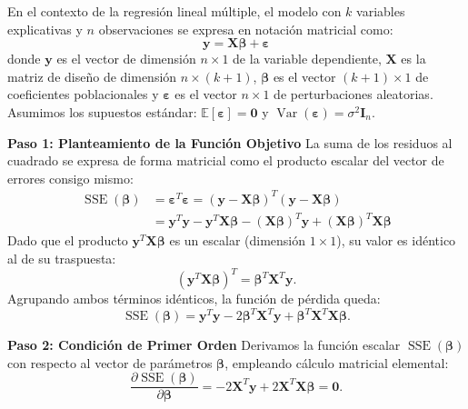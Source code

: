 \documentclass[11pt,a4paper]{article}
\begin{document}
En el contexto de la regresión lineal múltiple, el modelo con $k$ variables explicativas y $n$ observaciones se expresa en notación matricial como:
\begin{equation}
\mathbf{y} = \mathbf{X}\boldsymbol{\beta} + \boldsymbol{\varepsilon}
\end{equation}
donde $\mathbf{y}$ es el vector de dimensión $n \times 1$ de la variable dependiente, $\mathbf{X}$ es la matriz de diseño de dimensión $n \times (k+1)$, $\boldsymbol{\beta}$ es el vector $(k+1) \times 1$ de coeficientes poblacionales y $\boldsymbol{\varepsilon}$ es el vector $n \times 1$ de perturbaciones aleatorias. Asumimos los supuestos estándar: $\mathbb{E}[\boldsymbol{\varepsilon}] = \mathbf{0}$ y $\operatorname{Var}(\boldsymbol{\varepsilon}) = \sigma^2 \mathbf{I}_n$.

\begin{demobox}
\textbf{Paso 1: Planteamiento de la Función Objetivo}  
La suma de los residuos al cuadrado se expresa de forma matricial como el producto escalar del vector de errores consigo mismo:
\begin{align}
\operatorname{SSE}(\boldsymbol{\beta}) &= \boldsymbol{\varepsilon}^T \boldsymbol{\varepsilon} = (\mathbf{y} - \mathbf{X}\boldsymbol{\beta})^T (\mathbf{y} - \mathbf{X}\boldsymbol{\beta}) \\
&= \mathbf{y}^T \mathbf{y} - \mathbf{y}^T \mathbf{X} \boldsymbol{\beta} - (\mathbf{X}\boldsymbol{\beta})^T \mathbf{y} + (\mathbf{X}\boldsymbol{\beta})^T \mathbf{X}\boldsymbol{\beta}
\end{align}
Dado que el producto $\mathbf{y}^T \mathbf{X} \boldsymbol{\beta}$ es un escalar (dimensión $1 \times 1$), su valor es idéntico al de su traspuesta:
\begin{equation}
(\mathbf{y}^T \mathbf{X} \boldsymbol{\beta})^T = \boldsymbol{\beta}^T \mathbf{X}^T \mathbf{y}.
\end{equation}
Agrupando ambos términos idénticos, la función de pérdida queda:
\begin{equation}
\operatorname{SSE}(\boldsymbol{\beta}) = \mathbf{y}^T \mathbf{y} - 2\boldsymbol{\beta}^T \mathbf{X}^T \mathbf{y} + \boldsymbol{\beta}^T \mathbf{X}^T \mathbf{X} \boldsymbol{\beta}.
\end{equation}

\textbf{Paso 2: Condición de Primer Orden}  
Derivamos la función escalar $\operatorname{SSE}(\boldsymbol{\beta})$ con respecto al vector de parámetros $\boldsymbol{\beta}$, empleando cálculo matricial elemental:
\begin{equation}
\frac{\partial \operatorname{SSE}(\boldsymbol{\beta})}{\partial \boldsymbol{\beta}} = -2\mathbf{X}^T \mathbf{y} + 2\mathbf{X}^T \mathbf{X} \boldsymbol{\beta} = \mathbf{0}.
\end{equation}


\end{demobox}
\end{document}
